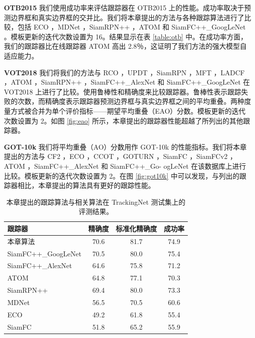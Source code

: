 \textbf{OTB2015} 我们使用成功率来评估跟踪器在 OTB2015 上的性能。成功率取决于预测边界框和真实边界框的交并比。我们将本章提出的方法与各种跟踪算法进行了比较，包括 ECO \cite{danelljan2017eco}，MDNet \cite{MDNet}，SiamRPN++ \cite{SiamRPN++}，ATOM \cite{danelljan2019atom} 和 SiamFC++\_GoogLeNet \cite{SiamFC++}。模板更新的迭代次数设置为 16。结果显示在表 \ref{table:otb} 中。在成功率方面，我们的跟踪器比在线跟踪器 ATOM 高出 2.8％，这证明了我们方法的强大模型自适应能力。

\textbf{VOT2018} 我们将我们的方法与 RCO \cite{kristan2018sixth}，UPDT \cite{bhat2018unveiling}，SiamRPN \cite{SiamRPN}，MFT \cite{kristan2018sixth}，LADCF \cite{kristan2018sixth}，ATOM \cite{danelljan2019atom}，SiamRPN++ \cite{SiamRPN++}，SiamFC++\_AlexNet \cite{SiamFC++} 和 SiamFC++\_GoogLeNet \cite{SiamFC++} 在 VOT2018 上进行了比较。使用鲁棒性和精确度来比较跟踪器。鲁棒性表示跟踪失败的次数，而精确度表示跟踪器预测边界框与真实边界框之间的平均重叠。两种度量方式被合并为单个评价指标——期望平均重叠（EAO）分数。模板更新的迭代次数设置为 2。如图 \ref{fig:eao} 所示，本章提出的跟踪器性能超越了所列出的其他跟踪器。

\textbf{GOT-10k} 我们将平均重叠（AO）分数用作 GOT-10k \cite{GOT-10k} 的性能指标。我们将本章提出的方法与 CF2 \cite{CF2}，ECO \cite{danelljan2017eco}，CCOT \cite{danelljan2016beyond}，GOTURN \cite{GOTURN}，SiamFC \cite{SiamFC}，SiamFCv2 \cite{valmadre2017end}，ATOM \cite{danelljan2019atom}，SiamFC++\_AlexNet \cite{SiamFC++} 和 SiamFC++\_Go-
ogLeNet \cite{SiamFC++} 在该数据库上进行比较。模板更新的迭代次数设置为 2。在图 \ref{fig:got10k} 中可以发现，与列出的跟踪器相比，本章提出的算法具有更好的跟踪性能。

\nopagebreak[3]
\begin{table}[t!]
\centering
\caption{本章提出的跟踪算法与相关算法在 TrackingNet \cite{muller2018trackingnet} 测试集上的评测结果。}
\begin{tabular}{l c c c}
\toprule
跟踪器   &  精确度   &  标准化精确度 & 成功率  \\
\midrule
本章算法  &  70.6&  81.7 &74.9 \\
SiamFC++\_GoogLeNet \cite{SiamFC++} & 70.5 & 80.0 & 75.4 \\
SiamFC++\_AlexNet \cite{SiamFC++} & 64.6 & 75.8 & 71.2 \\
ATOM \cite{danelljan2019atom} & 64.8 & 77.1 & 70.3 \\
SiamRPN++ \cite{SiamRPN++} &  69.4 & 80.0 &73.3 \\
MDNet \cite{MDNet} &  56.5&  70.5 &60.6 \\
ECO	\cite{danelljan2017eco} &  49.2&  61.8 &55.4 \\
SiamFC \cite{SiamFC} &  51.8&  65.2 &55.9 \\
\bottomrule
\end{tabular}
\label{tabel:trackingnet}
\end{table}
\nopagebreak[3]


